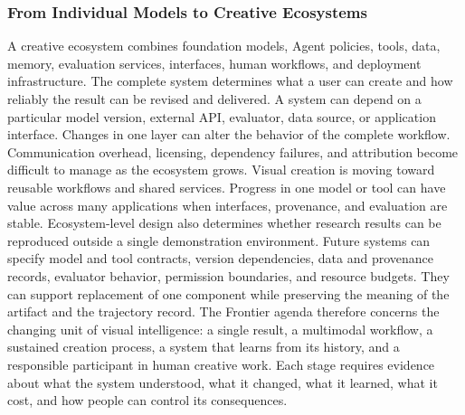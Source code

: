 \subsubsection{From Individual Models to Creative Ecosystems}

A creative ecosystem combines foundation models, Agent policies, tools, data, memory, evaluation services, interfaces, human workflows, and deployment infrastructure. The complete system determines what a user can create and how reliably the result can be revised and delivered. A system can depend on a particular model version, external API, evaluator, data source, or application interface. Changes in one layer can alter the behavior of the complete workflow. Communication overhead, licensing, dependency failures, and attribution become difficult to manage as the ecosystem grows. Visual creation is moving toward reusable workflows and shared services. Progress in one model or tool can have value across many applications when interfaces, provenance, and evaluation are stable. Ecosystem-level design also determines whether research results can be reproduced outside a single demonstration environment. Future systems can specify model and tool contracts, version dependencies, data and provenance records, evaluator behavior, permission boundaries, and resource budgets. They can support replacement of one component while preserving the meaning of the artifact and the trajectory record. The Frontier agenda therefore concerns the changing unit of visual intelligence: a single result, a multimodal workflow, a sustained creation process, a system that learns from its history, and a responsible participant in human creative work. Each stage requires evidence about what the system understood, what it changed, what it learned, what it cost, and how people can control its consequences.


